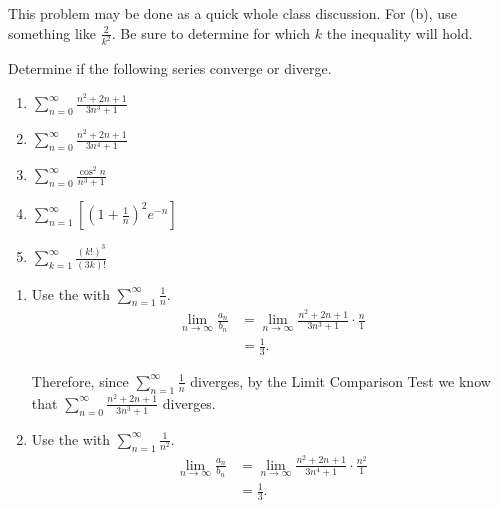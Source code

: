 \documentclass[]{ximera}
\begin{document}
\begin{instructorNotes}
This problem may be done as a quick whole class discussion.  
For (b), use something like $\frac{2}{k^2}$.  
Be sure to determine for which $k$ the inequality will hold.
\end{instructorNotes}







\begin{problem}
Determine if the following series converge or diverge.
	\begin{multicols}{2}
	\begin{enumerate}
	
	\item  $\sum_{n=0}^\infty \frac{n^2 + 2n + 1}{3n^3+1}$
	
	\item  $\sum_{n=0}^\infty \frac{n^2+2n+1}{3n^4+1}$
	
	\item  $\sum_{n=0}^\infty \frac{\cos^2 n}{n^3+1}$
	
	\item  $\sum_{n=1}^\infty \left[ \left( 1+\frac{1}{n} \right)^2 e^{-n} \right]$

	\item $\sum_{k=1}^{\infty} \frac{(k!)^3}{(3k)!}$
	
	\end{enumerate}
	\end{multicols}
	
	\begin{freeResponse}
		\begin{enumerate}
		
		\item  Use the  with $\sum_{n=1}^\infty \frac{1}{n}$.
			\begin{align*}
			\lim_{n \to \infty} \frac{a_n}{b_n}
			&= \lim_{n \to \infty} \frac{n^2+2n+1}{3n^3+1} \cdot \frac{n}{1}  \\
			&= \frac{1}{3}.
			\end{align*}
			
		Therefore, since $\sum_{n=1}^\infty \frac{1}{n}$ diverges, by the Limit Comparison Test we know that $\sum_{n=0}^\infty \frac{n^2+2n+1}{3n^3+1}$ diverges.
		
		
		
		\item  Use the  with $\sum_{n=1}^\infty \frac{1}{n^2}$.
			\begin{align*}
			\lim_{n \to \infty} \frac{a_n}{b_n}
			&= \lim_{n \to \infty} \frac{n^2+2n+1}{3n^4+1} \cdot \frac{n^2}{1}  \\
			&= \frac{1}{3}.
			\end{align*}
			

\end{enumerate}
\end{freeResponse}
\end{problem}
\end{document}
